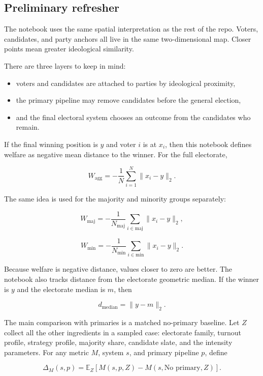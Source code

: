 \documentclass[11pt]{article}
\providecommand{\tightlist}{%
      \setlength{\itemsep}{0pt}\setlength{\parskip}{0pt}}
\begin{document}
\subsection{Preliminary refresher}\label{preliminary-refresher}

The notebook uses the same spatial interpretation as the rest of the
repo. Voters, candidates, and party anchors all live in the same
two-dimensional map. Closer points mean greater ideological similarity.

There are three layers to keep in mind:

\begin{itemize}
\tightlist
\item
  voters and candidates are attached to parties by ideological
  proximity,
\item
  the primary pipeline may remove candidates before the general
  election,
\item
  and the final electoral system chooses an outcome from the candidates
  who remain.
\end{itemize}

If the final winning position is \(y\) and voter \(i\) is at \(x_i\),
then this notebook defines welfare as negative mean distance to the
winner. For the full electorate,

\[
W_{\mathrm{agg}} = - \frac{1}{N} \sum_{i=1}^{N} \lVert x_i - y \rVert_2.
\]

The same idea is used for the majority and minority groups separately:

\[
W_{\mathrm{maj}} = - \frac{1}{N_{\mathrm{maj}}} \sum_{i \in \mathrm{maj}} \lVert x_i - y \rVert_2,
\]

\[
W_{\mathrm{min}} = - \frac{1}{N_{\mathrm{min}}} \sum_{i \in \mathrm{min}} \lVert x_i - y \rVert_2.
\]

Because welfare is negative distance, values closer to zero are better.
The notebook also tracks distance from the electorate geometric median.
If the winner is \(y\) and the electorate median is \(m\), then

\[
d_{\mathrm{median}} = \lVert y - m \rVert_2.
\]

The main comparison with primaries is a matched no-primary baseline. Let
\(Z\) collect all the other ingredients in a sampled case: electorate
family, turnout profile, strategy profile, majority share, candidate
slate, and the intensity parameters. For any metric \(M\), system \(s\),
and primary pipeline \(p\), define

\[
\Delta_M(s, p) = \mathbb{E}_{Z}\left[M(s, p, Z) - M(s, \text{No primary}, Z)\right].
\]
\end{document}
